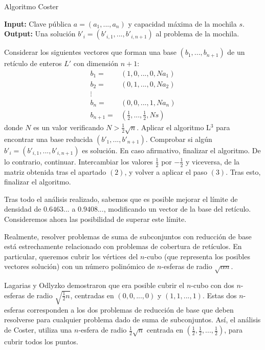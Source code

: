     \begin{algorithm}[H]
        \caption{Algoritmo Coster}
        \textbf{Input:} Clave pública $a = (a_{1}, ... , a_{n})$ y capacidad máxima de la mochila $s$.\\
        \textbf{Output:} Una solución $b'_{i} = (b'_{i,1}, ... , b'_{i,n+1})$ al problema de la mochila.
        \bigskip
        \begin{algorithmic}[1]
            \State Considerar los siguientes vectores que forman una base $(b_{1}, ... , b_{n+1})$ de un retículo de enteros $L'$ con dimensión $n+1$:
            \begin{align}
                b_{1} =& (1, 0, ... , 0, Na_{1}) \\
                b_{2} =& (0, 1, ... , 0, Na_{2}) \\
                \vdots&                          \\
                b_{n} =& (0, 0, ... , 1, Na_{n}) \\
                b_{n+1} =& (\frac{1}{2}, ..., \frac{1}{2}, Ns)
            \end{align}
            donde $N$ es un valor verificando $N > \frac{1}{2}\sqrt{n}$.
            \State Aplicar el algoritmo L$^{3}$ para encontrar una base reducida $(b'_{1}, ... , b'_{n+1})$.
            \State Comprobar si algún $b'_{i} = (b'_{i,1}, ... , b'_{i,n+1})$ es solución. En caso afirmativo, finalizar el algoritmo. De lo contrario, continuar.
            \State Intercambiar los valores $\frac{1}{2}$ por $-\frac{1}{2}$ y viceversa, de la matriz obtenida tras el apartado $(2)$, y volver a aplicar el paso $(3)$. Tras esto, finalizar el algoritmo.
        \end{algorithmic}
    \end{algorithm}

    Tras todo el análisis realizado, sabemos que es posible mejorar el límite de densidad de $0.6463...$ a $0.9408...$, modificando un vector de la base del retículo. Consideremos ahora las posibilidad de superar este límite.

    Realmente, resolver problemas de suma de subconjuntos con reducción de base está estrechamente relacionado con problemas de cobertura de retículos. En particular, queremos cubrir los vértices del $n$-cubo (que representa los posibles vectores solución) con un número polinómico de $n$-esferas de radio $\sqrt{\alpha n}$. 
    
    Lagarias y Odlyzko demostraron que era posible cubrir el $n$-cubo con dos $n$-esferas de radio $\sqrt{\frac{1}{2}n}$, centradas en $(0, 0, ... , 0)$ y $(1, 1, ... , 1)$. Estas dos $n$-esferas corresponden a los dos problemas de reducción de base que deben resolverse para cualquier problema dado de suma de subconjuntos. Así, el análisis de Coster, utiliza una $n$-esfera de radio $\frac{1}{2} \sqrt{n}$ centrada en $(\frac{1}{2}, \frac{1}{2}, ... , \frac{1}{2})$, para cubrir todos los puntos.

